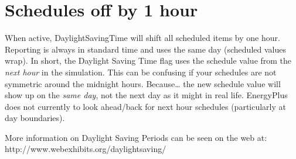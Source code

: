 \section{Schedules off by 1 hour}\label{schedules-off-by-1-hour}

When active, DaylightSavingTime will shift all scheduled items by one hour. Reporting is always in standard time and uses the same day (scheduled values wrap). In short, the Daylight Saving Time flag uses the schedule value from the \emph{next hour} in the simulation. This can be confusing if your schedules are not symmetric around the midnight hours. Because\ldots{} the new schedule value will show up on the \emph{same day}, not the next day as it might in real life. EnergyPlus does not currently to look ahead/back for next hour schedules (particularly at day boundaries).

More information on Daylight Saving Periods can be seen on the web at: http://www.webexhibits.org/daylightsaving/
